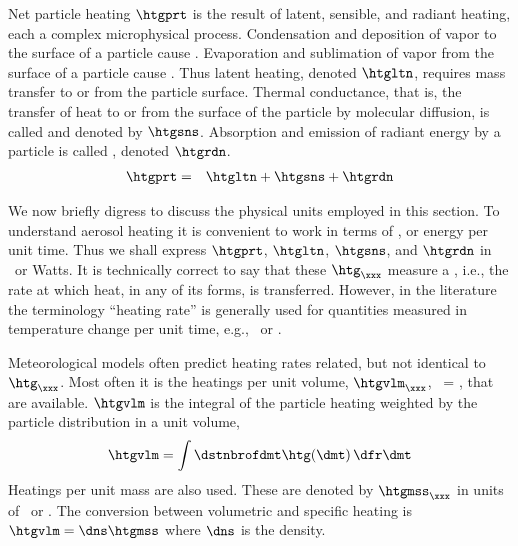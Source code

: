 \documentclass[12pt,twoside]{book}
\begin{document}
Net particle heating $\htgprt$ is the result of latent, sensible, and 
radiant heating, each a complex microphysical process.
Condensation and deposition of vapor to the surface of a particle
cause .
Evaporation and sublimation of vapor from the surface of a particle
cause .
Thus latent heating, denoted $\htgltn$, requires mass transfer to or
from the particle surface.
Thermal conductance, that is, the transfer of heat to or from the
surface of the particle by molecular diffusion, is called
 and denoted by $\htgsns$.
Absorption and emission of radiant energy by a particle is called
, denoted $\htgrdn$.
\begin{eqnarray}
\htgprt & = & \htgltn + \htgsns + \htgrdn
\label{eqn:htg_prt_dfn}
\end{eqnarray}

We now briefly digress to discuss the physical units employed in this
section. 
To understand aerosol heating it is convenient to work in terms of
, or energy per unit time.
Thus we shall express $\htgprt$, $\htgltn$, $\htgsns$, and $\htgrdn$
in \jxs\ or Watts.
It is technically correct to say that these $\htg_{\xxx}$ measure a
, i.e., the rate at which heat, in any of its
forms, is transferred.
However, in the literature the terminology ``heating rate'' is
generally used for quantities measured in temperature change per unit
time, e.g., \kxs\ or \kxday.

Meteorological models often predict heating rates related, but not
identical to $\htg_{\xxx}$.
Most often it is the heatings per unit volume, $\htgvlm_{\xxx}$, 
\jxmCs\ = \wxmC, that are available.
$\htgvlm$ is the integral of the particle heating weighted
by the particle distribution in a unit volume,
\begin{eqnarray}
\htgvlm = \int \dstnbrofdmt \htg (\dmt) \,\dfr\dmt
\end{eqnarray}
Heatings per unit mass are also used.
These are denoted by $\htgmss_{\xxx}$ in units of \jxkgs\ or \wxkg.
The conversion between volumetric and specific heating is 
$\htgvlm = \dns \htgmss$ where $\dns$ is the density.
\end{document}
